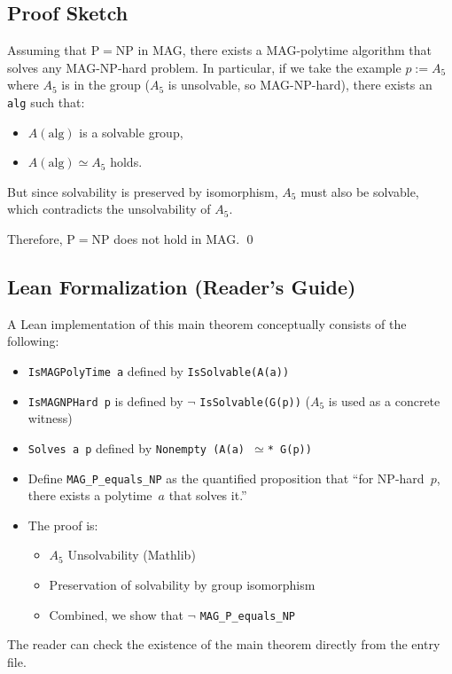 \documentclass[11pt,a4paper]{article}
\theoremstyle{plain}
\theoremstyle{definition}
\newcommand{\Aalt}{A_5}
\newcommand{\lean}[1]{\texttt{#1}}
\begin{document}
\subsection{Proof Sketch}

Assuming that $\mathrm{P}=\mathrm{NP}$ in MAG, there exists a MAG-polytime algorithm that solves any MAG-NP-hard problem. In particular, if we take the example $p := \Aalt$ where $\Aalt$ is in the group ($\Aalt$ is unsolvable, so MAG-NP-hard), there exists an \lean{alg} such that:
\begin{itemize}[nosep]
\item $A(\text{alg})$ is a solvable group,
\item $A(\text{alg}) \simeq \Aalt$ holds.
\end{itemize}
But since solvability is preserved by isomorphism, $\Aalt$ must also be solvable, which contradicts the unsolvability of $\Aalt$.

Therefore, $\mathrm{P}=\mathrm{NP}$ does not hold in MAG. \qed

\subsection{Lean Formalization (Reader's Guide)}

A Lean implementation of this main theorem conceptually consists of the following:
\begin{itemize}[nosep]
\item \lean{IsMAGPolyTime a} defined by \lean{IsSolvable(A(a))}
\item \lean{IsMAGNPHard p} is defined by $\neg$ \lean{IsSolvable(G(p))} ($\Aalt$ is used as a concrete witness)
\item \lean{Solves a p} defined by \lean{Nonempty (A(a) $\simeq$* G(p))}
\item Define \lean{MAG\_P\_equals\_NP} as the quantified proposition that ``for NP-hard~$p$, there exists a polytime~$a$ that solves it.''
\item The proof is:
  \begin{itemize}[nosep]
  \item $\Aalt$ Unsolvability (Mathlib)
  \item Preservation of solvability by group isomorphism
  \item Combined, we show that $\neg$ \lean{MAG\_P\_equals\_NP}
  \end{itemize}
\end{itemize}
The reader can check the existence of the main theorem directly from the entry file.
\end{document}

